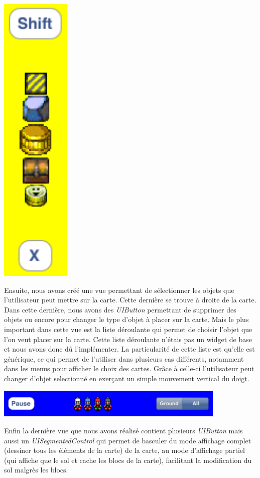 		\begin{center}
			\includegraphics{./Developpement/Img/menu_droite.pdf}
		\end{center}
			
		Ensuite, nous avons créé une vue permettant de sélectionner les objets que l'utilisateur peut mettre sur la carte. Cette dernière se trouve à droite de la carte. Dans cette dernière, nous avons des \textit{UIButton} permettant de supprimer des objets ou encore pour changer le type d'objet à placer sur la carte. Mais le plus important dans cette vue est la liste déroulante qui permet de choisir l'objet que l'on veut placer sur la carte. Cette liste déroulante n'étais pas un \gls{widget} de base et nous avons donc dû l'implémenter. La particularité de cette liste est qu'elle est générique, ce qui permet de l'utiliser dans plusieurs cas différents, notamment dans les menus pour afficher le choix des cartes. Grâce à celle-ci l'utilisateur peut changer d'objet selectionné en exerçant un simple mouvement vertical du doigt.
			
		\begin{center}
			\includegraphics[width=11cm]{./Developpement/Img/menu_haut.pdf}
		\end{center}
		Enfin la dernière vue que nous avons réalisé contient plusieurs \textit{UIButton} mais aussi un \textit{UISegmentedControl} qui permet de basculer du mode affichage complet (dessiner tous les éléments de la carte) de la carte, au mode d'affichage partiel (qui affiche que le sol et cache les blocs de la carte), facilitant la modification du sol malgrès les blocs.
			
